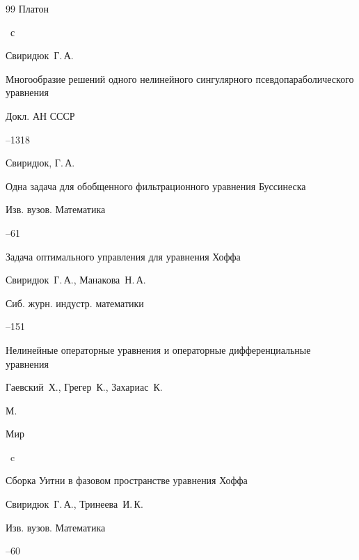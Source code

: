 \begin{thebibliography}{99}
\publ Платон


~с




\by Свиридюк~Г.\,А.

\paper Многообразие решений одного нелинейного сингулярного псевдопараболического уравнения

\jour Докл. АН СССР




--1318




\by Свиридюк, Г.\,А.

\paper Одна задача для обобщенного фильтрационного уравнения Буссинеска

\jour Изв. вузов. Математика



--61




\paper Задача оптимального управления для уравнения Хоф\-фа

\by Свиридюк~Г.\,А., Манакова~Н.\,А.

\jour  Сиб. журн. индустр. математики




--151






\book Нелинейные операторные уравнения и опе\-ра\-тор\-ные дифференциальные уравнения

\by Гаевский~Х., Грегер~К., Захариас~К.

\publaddr М.

\publ Мир


~c




\paper Сборка Уитни в фазовом пространстве уравнения Хоффа

\by Свиридюк~Г.\,А., Тринеева~И.\,К.

\jour Изв. вузов. Математика



--60



\end{thebibliography}





\makeengtitlem








